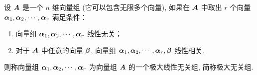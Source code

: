 \begin{definition}[极大线性无关组]
    设 $\vb*{A}$ 是一个 $n$ 维向量组 (它可以包含无限多个向量), 如果在 $\vb*{A}$ 中取出 $r$ 个向量 $\vb*{\alpha}_1,\vb*{\alpha}_2,\cdots,\vb*{\alpha}_r$ 满足条件：
    \begin{enumerate}[label=(\arabic{*})]
        \item 向量组 $\vb*{\alpha}_1,\vb*{\alpha}_2,\cdots,\vb*{\alpha}_r$ 线性无关；
        \item 对于 $\vb*{A}$ 中任意的向量 $\vb*{\beta}$, 向量组 $\vb*{\alpha}_1,\vb*{\alpha}_2,\cdots,\vb*{\alpha}_r,\vb*{\beta}$ 线性相关.
    \end{enumerate}
    则称向量组 $\vb*{\alpha}_1,\vb*{\alpha}_2,\cdots,\vb*{\alpha}_r$ 为向量组 $\vb*{A}$ 的一个极大线性无关组, 简称极大无关组.
\end{definition}

